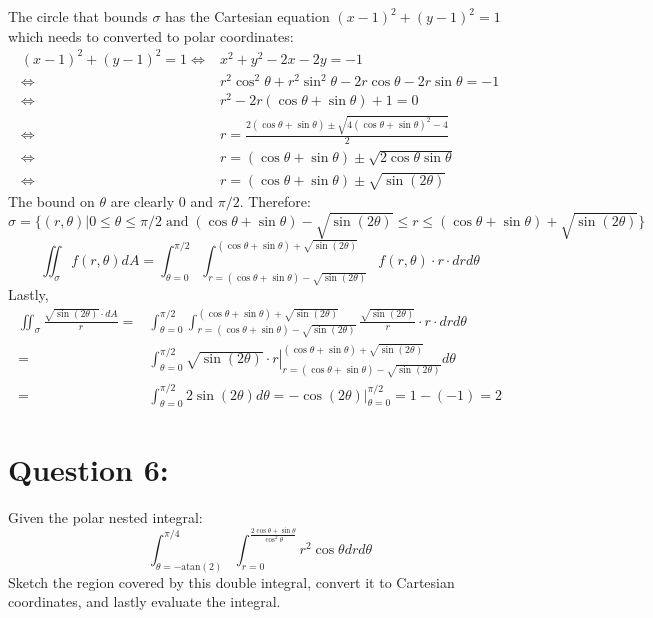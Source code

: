 \documentclass{article}
\newcommand{\atan}{\text{atan}}
\newcommand{\at}[1]{\left. #1 \right|}
\newcommand{\dr}[1]{\textcolor{dark_red}{#1}}
\begin{document}
\dr{
The circle that bounds \(\sigma\) has the Cartesian equation \((x - 1)^2 + (y - 1)^2 = 1\) which needs to converted to polar coordinates:
\begin{align*}
(x - 1)^2 + (y - 1)^2 = 1 \iff & x^2 + y^2 - 2x - 2y = -1 \\
\iff & r^2\cos^2\theta + r^2\sin^2\theta - 2r\cos\theta - 2r\sin\theta = -1 \\
\iff & r^2 - 2r(\cos\theta + \sin\theta) + 1 = 0 \\
\iff & r = \frac{2(\cos\theta + \sin\theta) \pm \sqrt{4(\cos\theta + \sin\theta)^2 - 4}}{2} \\
\iff & r = (\cos\theta + \sin\theta) \pm \sqrt{2\cos\theta\sin\theta} \\
\iff & r = (\cos\theta + \sin\theta) \pm \sqrt{\sin(2\theta)}
\end{align*}
The bound on \(\theta\) are clearly \(0\) and \(\pi/2\). Therefore:
\[\sigma = \{(r,\theta) | 0 \leq \theta \leq \pi/2 \;\text{and}\; (\cos\theta + \sin\theta) - \sqrt{\sin(2\theta)} \leq r \leq (\cos\theta + \sin\theta) + \sqrt{\sin(2\theta)}\}\]
\[\iint_{\sigma} f(r,\theta)dA = \int_{\theta = 0}^{\pi/2} \int_{r = (\cos\theta + \sin\theta) - \sqrt{\sin(2\theta)}}^{(\cos\theta + \sin\theta) + \sqrt{\sin(2\theta)}} f(r,\theta) \cdot r \cdot drd\theta\]
Lastly, 
\begin{align*}
\iint_{\sigma} \frac{\sqrt{\sin(2\theta)} \cdot dA}{r} = & \int_{\theta = 0}^{\pi/2} \int_{r = (\cos\theta + \sin\theta) - \sqrt{\sin(2\theta)}}^{(\cos\theta + \sin\theta) + \sqrt{\sin(2\theta)}} \frac{\sqrt{\sin(2\theta)}}{r} \cdot r \cdot drd\theta \\
= & \int_{\theta = 0}^{\pi/2} \at{\sqrt{\sin(2\theta)} \cdot r}_{r = (\cos\theta + \sin\theta) - \sqrt{\sin(2\theta)}}^{(\cos\theta + \sin\theta) + \sqrt{\sin(2\theta)}}d\theta \\ 
= & \int_{\theta = 0}^{\pi/2} 2\sin(2\theta) d\theta 
= \at{-\cos(2\theta)}_{\theta = 0}^{\pi/2} 
= 1 - (-1) = 2
\end{align*}
}




\section*{Question 6:}

Given the polar nested integral:
\[\int_{\theta = -\atan(2)}^{\pi/4}\int_{r = 0}^{\frac{2\cos\theta + \sin\theta}{\cos^2\theta}} r^2\cos\theta dr d\theta\]
Sketch the region covered by this double integral, convert it to Cartesian coordinates, and lastly evaluate the integral.
\end{document}
